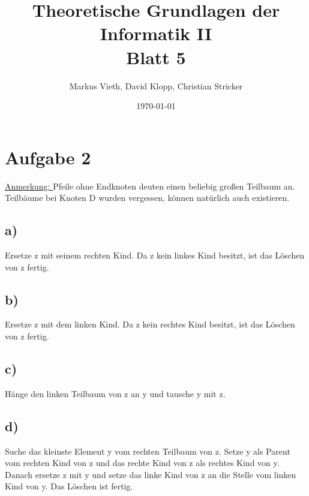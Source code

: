 \documentclass[a4paper,11pt,twoside]{article}
\title{Theoretische Grundlagen der Informatik II\\ Blatt 5}
\author{Markus Vieth, David Klopp, Christian Stricker}
\date{\today}
\begin{document}
\maketitle
\cleardoublepage
\pagestyle{myheadings}

\section*{Aufgabe 2}
\underline{Anmerkung: } Pfeile ohne Endknoten deuten einen beliebig großen Teilbaum an. Teilbäume bei Knoten D wurden vergessen, können natürlich auch existieren.
\subsection*{a)} Ersetze z mit seinem rechten Kind. Da z kein linkes Kind besitzt, ist das Löschen von z fertig.
\subsection*{b)}Ersetze z mit dem linken Kind. Da z kein rechtes Kind besitzt, ist das Löschen von z fertig.
\subsection*{c)} Hänge den linken Teilbaum von z an y und tausche y mit z.
\subsection*{d)} Suche das kleinste Element y vom rechten Teilbaum von z. Setze y als Parent vom rechten Kind von z und das rechte Kind von z als rechtes Kind von y. Danach ersetze z mit y und setze das linke Kind von z an die Stelle vom linken Kind von y. Das Löschen ist fertig.
\end{document}
